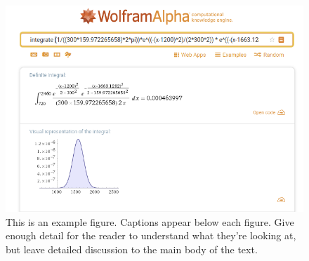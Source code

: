 \documentclass[11pt, a4paper]{article}
\begin{document}
\begin{figure}[h]
	\includegraphics[width=\columnwidth]{Example1}
    \caption{This is an example figure. Captions appear below each figure.
	Give enough detail for the reader to understand what they're looking at,
	but leave detailed discussion to the main body of the text.}
    \label{fig:example_figure}
\end{figure}





\end{document}
